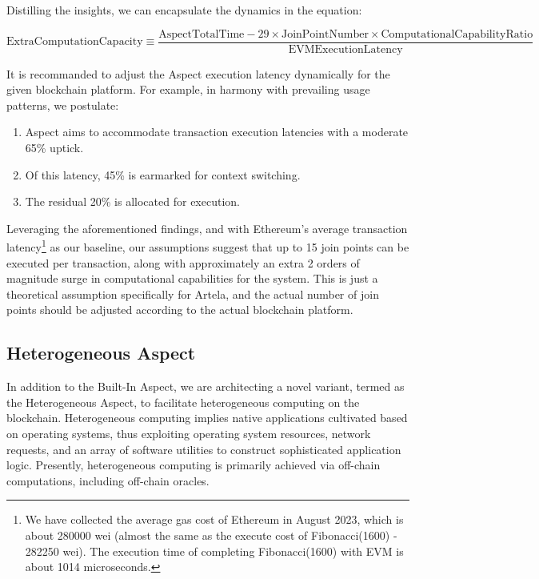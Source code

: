 Distilling the insights, we can encapsulate the dynamics in the equation:

\[
  \text{ExtraComputationCapacity} \equiv \frac{\text{AspectTotalTime} - 29 \times \text{JoinPointNumber} \times \text{ComputationalCapabilityRatio}}{\text{EVMExecutionLatency}}
\]

\pagebreak

It is recommanded to adjust the Aspect execution latency dynamically for the given blockchain platform. For example, in harmony with prevailing usage patterns, we postulate:

\begin{enumerate}
  \item Aspect aims to accommodate transaction execution latencies with a moderate 65\% uptick.
  \item Of this latency, 45\% is earmarked for context switching.
  \item The residual 20\% is allocated for execution.
\end{enumerate}

Leveraging the aforementioned findings, and with Ethereum's average transaction latency\footnote{We have collected the average gas cost of Ethereum in August 2023, which is about 280000 wei (almost the same as the execute cost of Fibonacci(1600) - 282250 wei). The execution time of completing Fibonacci(1600) with EVM is about 1014 microseconds.} as our baseline, our assumptions suggest that up to 15 join points can be executed per transaction, along with approximately an extra 2 orders of magnitude surge in computational capabilities for the system. This is just a theoretical assumption specifically for Artela, and the actual number of join points should be adjusted according to the actual blockchain platform.

\subsection{Heterogeneous Aspect}

In addition to the Built-In Aspect, we are architecting a novel variant, termed as the Heterogeneous Aspect, to facilitate heterogeneous computing on the blockchain. Heterogeneous computing implies native applications cultivated based on operating systems, thus exploiting operating system resources, network requests, and an array of software utilities to construct sophisticated application logic. Presently, heterogeneous computing is primarily achieved via off-chain computations, including off-chain oracles.

